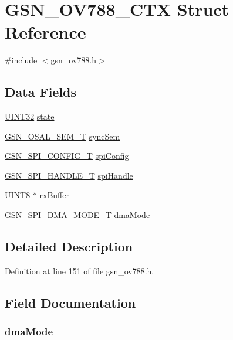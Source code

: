 \hypertarget{a00179}{
\section{GSN\_\-OV788\_\-CTX Struct Reference}
\label{a00179}
}


{\ttfamily \#include $<$gsn\_\-ov788.h$>$}

\subsection*{Data Fields}
\begin{DoxyCompactItemize}
\item 
\hyperlink{a00660_gae1e6edbbc26d6fbc71a90190d0266018}{UINT32} \hyperlink{a00179_ae96391255eaada679c3f1a843b5530a5}{state}
\item 
\hyperlink{a00628_gab4b3554407ce22b940e2fcd3faf5fd47}{GSN\_\-OSAL\_\-SEM\_\-T} \hyperlink{a00179_a79fd8ca5c0b5ff111ca7bf3d5caa9572}{syncSem}
\item 
\hyperlink{a00231}{GSN\_\-SPI\_\-CONFIG\_\-T} \hyperlink{a00179_aaa45f93abc04d3ee7a70c0e8f5f382f3}{spiConfig}
\item 
\hyperlink{a00238}{GSN\_\-SPI\_\-HANDLE\_\-T} \hyperlink{a00179_a7e0135436cf308167541ff8fbb5756f4}{spiHandle}
\item 
\hyperlink{a00660_gab27e9918b538ce9d8ca692479b375b6a}{UINT8} $\ast$ \hyperlink{a00179_a1ce88e0bfbac38218165129d8ffdd2b5}{rxBuffer}
\item 
\hyperlink{a00655_gafff743b26bbfafb380a9797457935a0e}{GSN\_\-SPI\_\-DMA\_\-MODE\_\-T} \hyperlink{a00179_a8745e343cad523631d63304871d0bdf3}{dmaMode}
\end{DoxyCompactItemize}


\subsection{Detailed Description}


Definition at line 151 of file gsn\_\-ov788.h.



\subsection{Field Documentation}
\hypertarget{a00179_a8745e343cad523631d63304871d0bdf3}{
\subsubsection[{dmaMode}]{ {\bf dmaMode}}}
\label{a00179_a8745e343cad523631d63304871d0bdf3}


